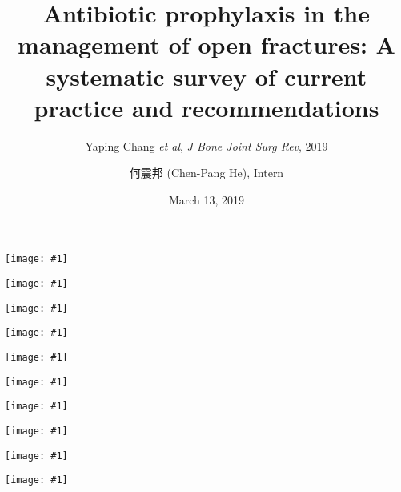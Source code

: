 \documentclass{beamer}
\title[Prophylaxis in open fracture]{
    Antibiotic prophylaxis in the management of open fractures:
    A systematic survey of current practice and recommendations
}
\subtitle{Yaping Chang \textit{et al}, \textit{J Bone Joint Surg Rev}, 2019}
\author[Chen-Pang He]{何震邦 (Chen-Pang He), Intern}
\date{March 13, 2019}
\institute[CGH]{Cathay General Hospital}
\newcommand*{\solo}[1]{\centering\texttt{[image: \#1]}}
\begin{document}
\maketitle

\begin{frame}
    \solo{F1.jpg}
\end{frame}

\begin{frame}
    \solo{T1.pdf}
\end{frame}

\begin{frame}
    \solo{T2.pdf}
\end{frame}

\begin{frame}
    \solo{T3.pdf}
\end{frame}

\begin{frame}
    \solo{T4.pdf}
\end{frame}

\begin{frame}
    \solo{T5.pdf}
\end{frame}

\begin{frame}
    \solo{T6.pdf}
\end{frame}

\begin{frame}
    \solo{E1.pdf}
\end{frame}

\begin{frame}
    \solo{E2.pdf}
\end{frame}

\begin{frame}
    \solo{E3.pdf}
\end{frame}
\end{document}
